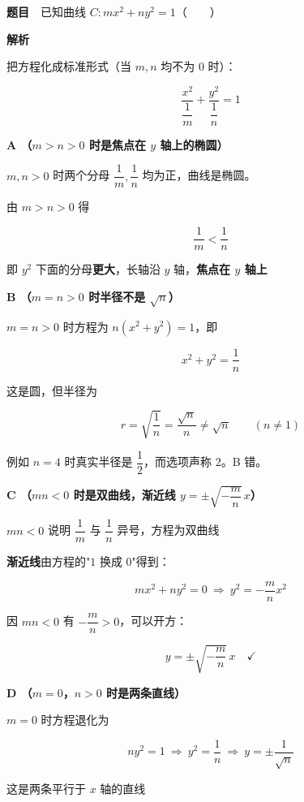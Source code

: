 
\textbf{题目}　已知曲线 $C:mx^{2}+ny^{2}=1$（　　）

\textbf{解析}

把方程化成标准形式（当 $m,n$ 均不为 $0$ 时）：

\[\frac{x^{2}}{\dfrac1m}+\frac{y^{2}}{\dfrac1n}=1\]

\par\medskip

\textbf{A （$m>n>0$ 时是焦点在 $y$ 轴上的椭圆）}

$m,n>0$ 时两个分母 $\dfrac1m,\dfrac1n$ 均为正，曲线是椭圆。

由 $m>n>0$ 得

\[\frac1m<\frac1n\]

即 $y^{2}$ 下面的分母\textbf{更大}，长轴沿 $y$ 轴，\textbf{焦点在 $y$ 轴上} 

\par\medskip

\textbf{B （$m=n>0$ 时半径不是 $\sqrt n$）}

$m=n>0$ 时方程为 $n\left(x^{2}+y^{2}\right)=1$，即

\[x^{2}+y^{2}=\frac1n\]

这是圆，但半径为

\[r=\sqrt{\frac1n}=\frac{\sqrt n}n\ne\sqrt n\qquad(n\ne1)\]

例如 $n=4$ 时真实半径是 $\dfrac12$，而选项声称 $2$。B 错。

\par\medskip

\textbf{C （$mn<0$ 时是双曲线，渐近线 $y=\pm\sqrt{-\dfrac mn}\,x$）}

$mn<0$ 说明 $\dfrac1m$ 与 $\dfrac1n$ 异号，方程为双曲线 

\textbf{渐近线}由方程的"$1$ 换成 $0$"得到：

\[mx^{2}+ny^{2}=0\ \Longrightarrow\ y^{2}=-\frac mn x^{2}\]

因 $mn<0$ 有 $-\dfrac mn>0$，可以开方：

\[y=\pm\sqrt{-\frac mn}\,x\quad\checkmark\]

\par\medskip

\textbf{D （$m=0$，$n>0$ 时是两条直线）}

$m=0$ 时方程退化为

\[ny^{2}=1\ \Longrightarrow\ y^{2}=\frac1n\ \Longrightarrow\ y=\pm\frac1{\sqrt n}\]

这是两条平行于 $x$ 轴的直线 


